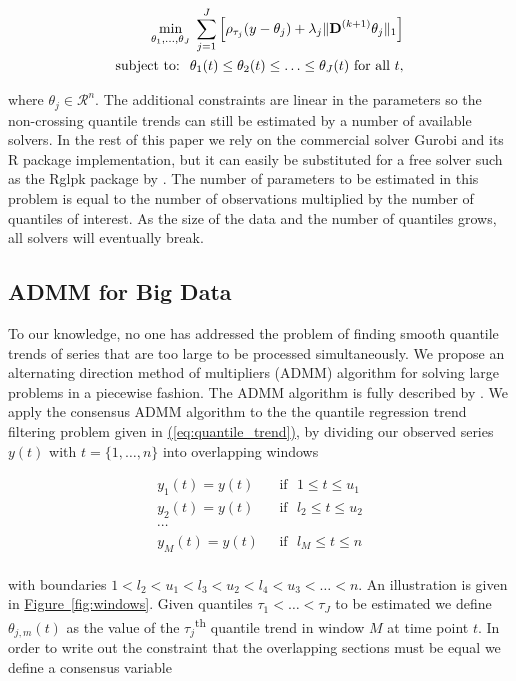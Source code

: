 \documentclass[12pt]{article}
\newcommand{\Eqn}[1]{\hyperref[eq:#1]{{\rm (\ref*{eq:#1})}}} %
\newcommand{\Fig}[1]{\hyperref[fig:#1]{Figure~\ref*{fig:#1}}} %
\newcommand{\Eqn}[1]{{(\ref{eq:#1})}} %
\newcommand{\Fig}[1]{{Figure~\ref{fig:#1}}} %
\newcommand{\M}[1]{{\bm{\mathbf{\MakeUppercase{#1}}}}} %
\newcommand{\Mn}[2]{\M{#1}^{(#2)}} %
\begin{document}
	\begin{eqnarray}
	\label{eq:noncross_trend}
	\underset{\theta_1, \ldots, \theta_J}{\min}\; \sum_{j=1}^J \left [\rho_{\tau_j}(y - \theta_{j}) + 
	\lambda_j \lVert \Mn{D}{k+1} \theta_j \rVert_1 \right ] \\
	 \text{subject to: }\; \theta_{1}(t) \le \theta_{2}(t) \le \ldots \le \theta_{J}(t) \text{ for all } t,
	\end{eqnarray}
	
	where $\theta_j \in \mathcal{R}^n$. The additional constraints are linear in the parameters so the non-crossing quantile trends can still be estimated by a number of available solvers. In the rest of this paper we rely on the commercial solver Gurobi \citep{gurobi} and its R package implementation, but it can easily be substituted for a free solver such as the Rglpk package by \cite{rglpk}. The number of parameters to be estimated in this problem is equal to the number of observations multiplied by the number of quantiles of interest. As the size of the data and the number of quantiles grows, all solvers will eventually break. 
	
	\subsection{ADMM for Big Data}
	
	To our knowledge, no one has addressed the problem of finding smooth quantile trends of series that are too large to be processed simultaneously. We propose an alternating direction method of multipliers (ADMM) algorithm for solving large problems in a piecewise fashion. The ADMM algorithm \citep{gabay1975dual, glowinski1975approximation} is fully described by \cite{boyd2011distributed}. We apply the consensus ADMM algorithm to the the quantile regression trend filtering problem given in \Eqn{quantile_trend}, by dividing our observed series $y(t)$ with $t = \{1, \ldots, n\}$ into overlapping windows 
	
	\begin{align*}
	y_1(t) = y(t) & \mbox{~~if~~} 1 \le t \le u_{1}\\
	y_2(t) = y(t) & \mbox{~~if~~} l_{2} \le t \le u_{2} \\
	\cdots & \\
	y_M(t) = y(t) & \mbox{~~if~~} l_{M} \le t \le  n\\
	\end{align*}

	 with boundaries $1 < l_{2} < u_{1} < l_{3} < u_{2} < l_{4} < u_{3} < \ldots< n$. An illustration is given in \Fig{windows}. Given quantiles $\tau_1 < \ldots < \tau_J$ to be estimated we define $\theta_{j,m}(t)$ as the value of the $\tau_j$\textsuperscript{th} quantile trend in window $M$ at time point $t$. In order to write out the constraint that the overlapping sections must be equal we define a consensus variable
	 
\end{document}
